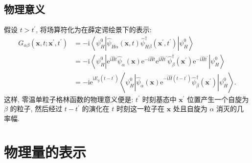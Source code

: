 \subsection{物理意义}
假设 $t>t^{\prime}$, 将场算符化为在薛定谔绘景下的表示:
\begin{align}
G_{\alpha \beta}\left(\boldsymbol{x}, t ; \boldsymbol{x}^{\prime}, t^{\prime}\right) &=-\mathrm{i}\left\langle\psi_{H}^{0}\left|\hat{\psi}^{}_{H \alpha}(\boldsymbol{x}, t) \hat{\psi}_{H \beta}^{\dagger}\left(\boldsymbol{x}^{\prime}, t^{\prime}\right)\right| \psi_{H}^{0}\right\rangle \nonumber\\
&=-\mathrm{i}\left\langle\psi_{H}^{0}\left|\mathrm{e}^{\mathrm{i} \hat{H} t}\hat{\psi}^{}_{\alpha}(\boldsymbol{x})\mathrm{e}^{-\mathrm{i} \hat{H} t}\mathrm{e}^{\mathrm{i} \hat{H} t^{\prime}} \hat{\psi}_{\beta}^{\dagger}\left(\boldsymbol{x}^{\prime}\right)\mathrm{e}^{-\mathrm{i} \hat{H} t^{\prime}}\right| \psi_{H}^{0}\right\rangle\nonumber\\
&=-\mathrm{i} \mathrm{e}^{\mathrm{i} E_{g}\left(t-t^{\prime}\right)}\left\langle\psi_{H}^{0}\left|\hat{\psi}^{}_{\alpha}(\boldsymbol{x}) \mathrm{e}^{-\mathrm{i}\hat{H}\left(t-t^{\prime}\right)} \hat{\psi}_{\beta}^{\dagger}\left(\boldsymbol{x}^{\prime}\right)\right| \psi_{H}^{0}\right\rangle .
\end{align}
这样, 零温单粒子格林函数的物理意义便是: $t^{\prime}$ 时刻基态中 $\boldsymbol{x}^{\prime}$ 位置产生一个自旋为 $\beta$ 的粒子, 然后经过 $t-t^{\prime}$ 的演化在 $t$ 时刻这一粒子在 $\boldsymbol{x}$ 处且自旋为 $\alpha$ 消灭的几率幅.

\section{物理量的表示}

